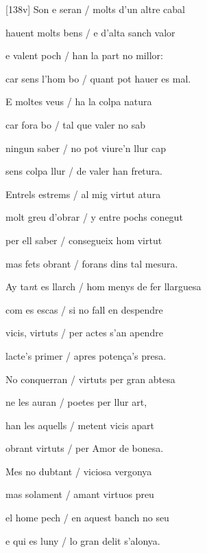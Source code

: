 \documentclass[12pt]{article}
\begin{document}
\begin{estrofa}

 [138v] Son e seran / molts d'un altre cabal

 hauent molts bens / e d'alta sanch valor

 e valent poch / han la part no millor:

 car sens l'hom bo / quant pot hauer es mal.

 E moltes veus / ha la colpa natura

 car fora bo / tal que valer no sab

 ningun saber / no pot viure'n llur cap

 sens colpa llur / de valer han fretura.

\end{estrofa}



\begin{estrofa}

 Entrels estrems / al mig virtut atura

 molt greu d'obrar / y entre pochs conegut

 per ell saber / consegueix hom virtut

 mas fets obrant / forans dins tal mesura.

 Ay ta\textit{n}t es llarch / hom menys de fer llarguesa

 com es escas / si no fall en despendre

 vicis, virtuts / per actes s'an apendre

 lacte's primer / apres poten\c{c}a's presa.

\end{estrofa}



\begin{estrofa}

 No conquerran / virtuts per gran abtesa

 ne les auran / poetes per llur art,

 han les aquells / metent vicis apart

 obrant virtuts / per Amor de bonesa.

 Mes no dubtant / viciosa vergonya

 mas solament / amant virtuos preu

 el home pech / en aquest banch no seu

 e qui es luny / lo gran delit s'alonya.

\end{estrofa}
\end{document}
